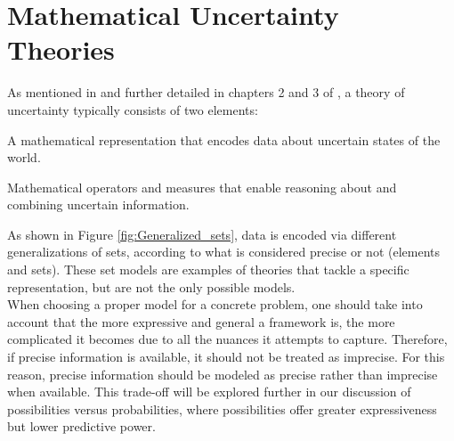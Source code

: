 \section{Mathematical Uncertainty Theories}

As mentioned in \cite{uncertaintymeasuresbigpicture} and further detailed in chapters 2 and 3 of \cite{UncertaintySciences}, a theory of uncertainty typically consists of two elements:

\begin{romanenum}
    \item A mathematical representation that encodes data about uncertain states of the world.
    \item Mathematical operators and measures that enable reasoning about and combining uncertain information.
\end{romanenum}

As shown in Figure \ref{fig:Generalized_sets}, data is encoded via different generalizations of sets, according to what is considered precise or not (elements and sets). These set models are examples of theories that tackle a specific representation, but are not the only possible models.\\

When choosing a proper model for a concrete problem, one should 
take into account that the more expressive and general a framework 
is, the more complicated it becomes due to all the nuances it 
attempts to capture. Therefore, if precise information is 
available, it should not be treated as imprecise. For this reason, precise information should be modeled as precise rather than imprecise when available. This trade-off will be explored further in our discussion of possibilities versus probabilities, where possibilities offer greater expressiveness but lower predictive power.


